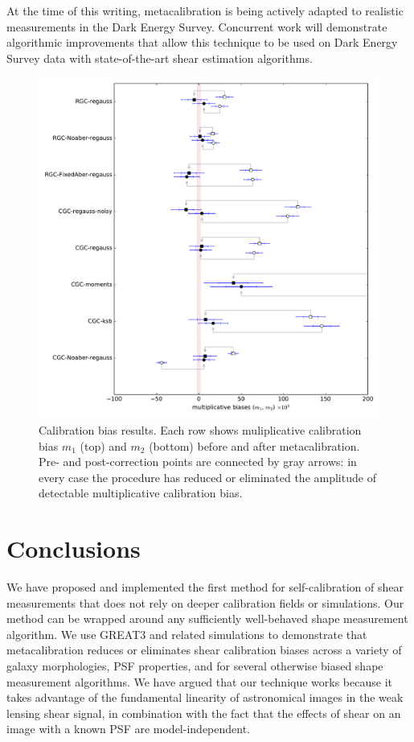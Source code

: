 \documentclass[iop]{emulateapj}
\begin{document}
At the time of this writing, metacalibration is being actively adapted
to realistic measurements in the Dark Energy Survey. Concurrent work
\citep{metacalII} will demonstrate algorithmic improvements that
allow this technique to be used on Dark Energy Survey data with
state-of-the-art shear estimation algorithms.

\begin{figure}[t]
\begin{center}
\includegraphics[width=0.8\linewidth]{m_results_linear.pdf}
\end{center}
\caption{Calibration bias results. Each row shows muliplicative
  calibration bias $m_1$ (top) and $m_2$ (bottom) before and after
  metacalibration. Pre- and post-correction points are connected by
  gray arrows: in every case the procedure has reduced or eliminated
  the amplitude of detectable multiplicative calibration bias.}
\label{fig:m_results}
\end{figure}

\section{Conclusions}
We have proposed and implemented the first method for self-calibration
of shear measurements that does not rely on deeper calibration fields or
simulations. Our method can be wrapped around
any sufficiently well-behaved shape measurement algorithm.  We use
GREAT3 and related simulations to demonstrate that metacalibration
reduces or eliminates shear calibration biases across a variety of
galaxy morphologies, PSF properties, and for several otherwise biased
shape measurement algorithms. We have argued that our technique works
because it takes advantage of the fundamental linearity of
astronomical images in the weak lensing shear signal, in
combination with the fact that the effects of shear on an image with a
known PSF are model-independent.
\end{document}
